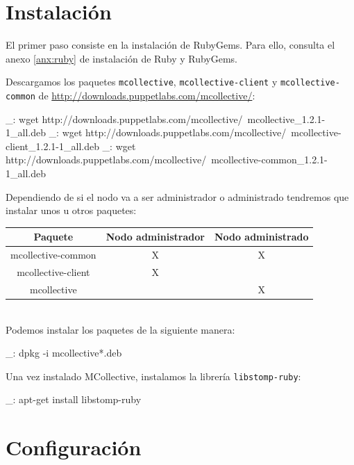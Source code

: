 \section{Instalación}

El primer paso consiste en la instalación de RubyGems. Para ello, consulta el anexo \ref{anx:ruby} de instalación de Ruby y RubyGems.

Descargamos los paquetes \texttt{mcollective}, \texttt{mcollective-client} y \texttt{mcollective-common} de \url{http://downloads.puppetlabs.com/mcollective/}:

\begin{bashcode}
_: wget http://downloads.puppetlabs.com/mcollective/\
mcollective_1.2.1-1_all.deb
_: wget http://downloads.puppetlabs.com/mcollective/\
mcollective-client_1.2.1-1_all.deb
_: wget http://downloads.puppetlabs.com/mcollective/\
mcollective-common_1.2.1-1_all.deb
\end{bashcode}

Dependiendo de si el nodo va a ser administrador o administrado tendremos que instalar unos u otros paquetes:

\begin{tabular}{|c|c|c|}
   \hline
   Paquete & Nodo administrador & Nodo administrado \\ \hline
   mcollective-common & X & X \\ \hline
   mcollective-client & X &   \\ \hline
   mcollective &  & X \\ \hline
\end{tabular}
\\

Podemos instalar los paquetes de la siguiente manera:

\begin{bashcode}
_: dpkg -i mcollective*.deb
\end{bashcode}

Una vez instalado MCollective, instalamos la librería \texttt{libstomp-ruby}:

\begin{bashcode}
_: apt-get install libstomp-ruby
\end{bashcode}


\section{Configuración}

